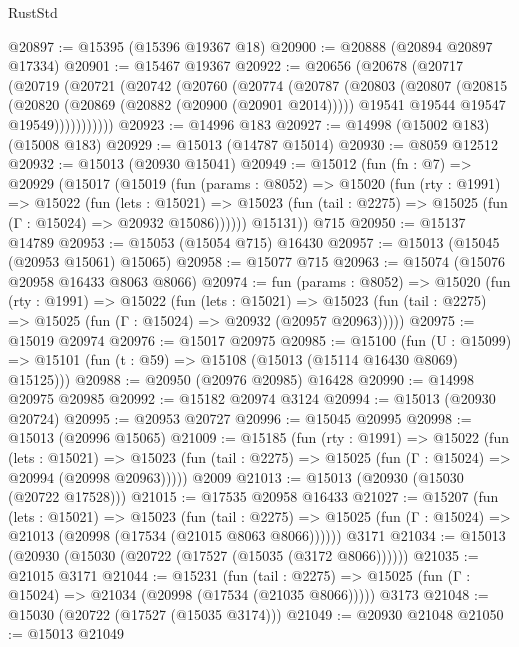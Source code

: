 \begin{lexlean}{RustStd}
\begin{coremodule}
@20897 := @15395 (@15396 @19367 @18)
@20900 := @20888 (@20894 @20897 @17334)
@20901 := @15467 @19367
@20922 := @20656
    (@20678
      (@20717
        (@20719
          (@20721
            (@20742
              (@20760
                (@20774
                  (@20787
                    (@20803
                      (@20807
                        (@20815
                          (@20820 (@20869 (@20882 (@20900 (@20901 @2014)))))
                          @19541
                          @19544
                          @19547
                          @19549)))))))))))
@20923 := @14996 @183
@20927 := @14998 (@15002 @183) (@15008 @183)
@20929 := @15013 (@14787 @15014)
@20930 := @8059 @12512
@20932 := @15013 (@20930 @15041)
@20949 := @15012
    (fun (fn : @7) =>
    @20929
      (@15017
        (@15019
          (fun (params : @8052) =>
          @15020
            (fun (rty : @1991) =>
            @15022
              (fun (lets : @15021) =>
              @15023 (fun (tail : @2275) => @15025 (fun (Γ : @15024) => @20932 @15086))))))
        @15131))
    @715
@20950 := @15137 @14789
@20953 := @15053 (@15054 @715) @16430
@20957 := @15013 (@15045 (@20953 @15061) @15065)
@20958 := @15077 @715
@20963 := @15074 (@15076 @20958 @16433 @8063 @8066)
@20974 := fun (params : @8052) =>
  @15020
    (fun (rty : @1991) =>
    @15022
      (fun (lets : @15021) =>
      @15023 (fun (tail : @2275) => @15025 (fun (Γ : @15024) => @20932 (@20957 @20963)))))
@20975 := @15019 @20974
@20976 := @15017 @20975
@20985 := @15100
    (fun (U : @15099) => @15101 (fun (t : @59) => @15108 (@15013 (@15114 @16430 @8069) @15125)))
@20988 := @20950 (@20976 @20985) @16428
@20990 := @14998 @20975 @20985
@20992 := @15182 @20974 @3124
@20994 := @15013 (@20930 @20724)
@20995 := @20953 @20727
@20996 := @15045 @20995
@20998 := @15013 (@20996 @15065)
@21009 := @15185
    (fun (rty : @1991) =>
    @15022
      (fun (lets : @15021) =>
      @15023 (fun (tail : @2275) => @15025 (fun (Γ : @15024) => @20994 (@20998 @20963)))))
    @2009
@21013 := @15013 (@20930 (@15030 (@20722 @17528)))
@21015 := @17535 @20958 @16433
@21027 := @15207
    (fun (lets : @15021) =>
    @15023
      (fun (tail : @2275) =>
      @15025 (fun (Γ : @15024) => @21013 (@20998 (@17534 (@21015 @8063 @8066))))))
    @3171
@21034 := @15013 (@20930 (@15030 (@20722 (@17527 (@15035 (@3172 @8066))))))
@21035 := @21015 @3171
@21044 := @15231
    (fun (tail : @2275) => @15025 (fun (Γ : @15024) => @21034 (@20998 (@17534 (@21035 @8066)))))
    @3173
@21048 := @15030 (@20722 (@17527 (@15035 @3174)))
@21049 := @20930 @21048
@21050 := @15013 @21049

\end{coremodule}
\end{lexlean}
